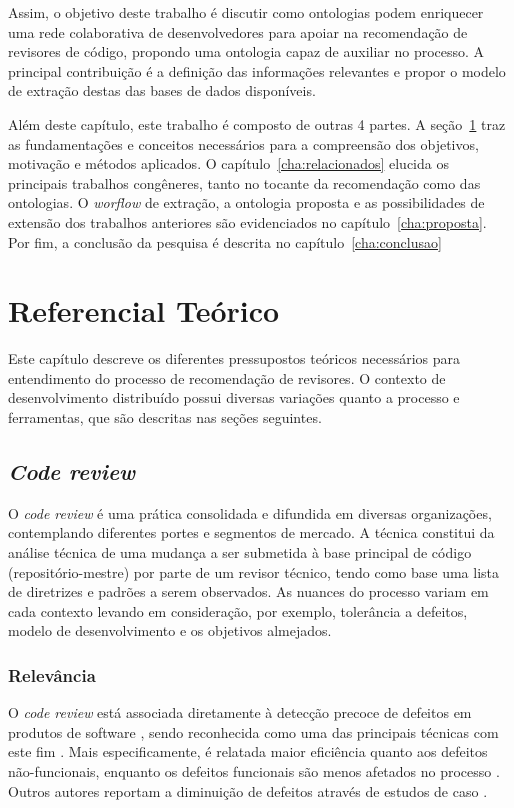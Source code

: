 \documentclass[a4paper,12pt]{monografia}
\theoremstyle{plain}
\theoremstyle{definition}
\theoremstyle{remark}
\begin{document}
Assim, o objetivo deste trabalho é discutir como ontologias podem enriquecer uma rede colaborativa de desenvolvedores para apoiar na recomendação de revisores de código, propondo uma ontologia capaz de auxiliar no processo. A principal contribuição é a definição das informações relevantes e propor o modelo de extração destas das bases de dados disponíveis.

Além deste capítulo, este trabalho é composto de outras 4 partes. A seção~\ref{cha:referencial} traz as fundamentações e conceitos necessários para a compreensão dos objetivos, motivação e métodos aplicados. O capítulo~\ref{cha:relacionados} elucida os principais trabalhos congêneres, tanto no tocante da recomendação como das ontologias. O \textit{worflow} de extração, a ontologia proposta e as possibilidades de extensão dos trabalhos anteriores são evidenciados no capítulo~\ref{cha:proposta}. Por fim, a conclusão da pesquisa é descrita no capítulo~\ref{cha:conclusao}

\chapter{Referencial Teórico}\label{cha:referencial}

Este capítulo descreve os diferentes pressupostos teóricos necessários para entendimento do processo de recomendação de revisores. O contexto de desenvolvimento distribuído possui diversas variações quanto a processo e ferramentas, que são descritas nas seções seguintes.

\section{\textit{Code review}}\label{sec:code_review}
  O \textit{code review} é uma prática consolidada e difundida em diversas organizações, contemplando diferentes portes e segmentos de mercado. A técnica constitui da análise técnica de uma mudança a ser submetida à base principal de código (repositório-mestre) por parte de um revisor técnico, tendo como base uma lista de diretrizes e padrões a serem observados. As nuances do processo variam em cada contexto levando em consideração, por exemplo, tolerância a defeitos, modelo de desenvolvimento e os objetivos almejados.

\subsection{Relevância}\label{sec:relevancia}
  O \textit{code review} está associada diretamente à detecção precoce de defeitos em produtos de software \cite{schettino2014,Kemerer2009}, sendo reconhecida como uma das principais técnicas com este fim \cite{Boehm2001}. Mais especificamente, é relatada maior eficiência quanto aos defeitos não-funcionais, enquanto os defeitos funcionais são menos afetados no processo \cite{Beller2014202}. Outros autores reportam a diminuição de defeitos através de estudos de caso \cite{McIntosh2014192,Bavota201581,Morales2015171}.
\end{document}
